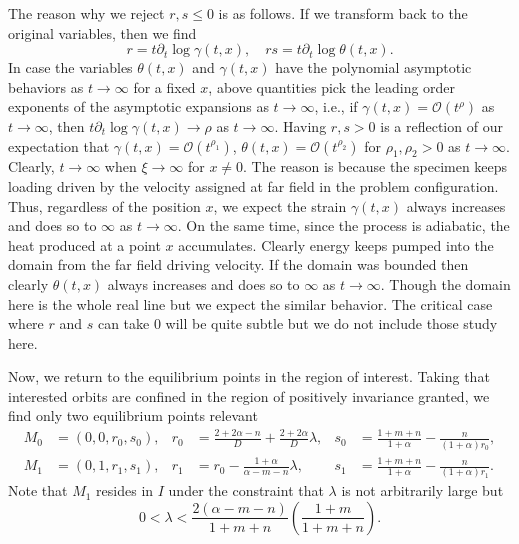 \documentclass[a4paper,11pt]{article}
\begin{document}
The reason why we reject $r,s\le0$ is as follows. If we transform back to the original variables, then we find
\begin{equation*}
 r=t\partial_t\log \gamma(t,x), \quad rs=t\partial_t \log \theta(t,x).
\end{equation*}
In case the variables $\theta(t,x)$ and $\gamma(t,x)$ have the polynomial asymptotic behaviors as $t \rightarrow \infty$ for a fixed $x$, above quantities pick the leading order exponents of the asymptotic expansions as $t \rightarrow \infty$, i.e., if $\gamma(t,x) = \mathcal{O}(t^\rho)$ as $t \rightarrow \infty$, then $t\partial_t\log \gamma(t,x) \rightarrow \rho$ as $t \rightarrow \infty$. Having $r,s>0$ is a reflection of our expectation that $\gamma(t,x) = \mathcal{O}(t^{\rho_1})$, $\theta(t,x) = \mathcal{O}(t^{\rho_2})$ for $\rho_1,\rho_2 >0$ as $t \rightarrow \infty$. Clearly, $t \rightarrow \infty$ when $\xi \rightarrow \infty$ for $x\ne0$. The reason is because the specimen keeps loading driven by the velocity assigned at far field in the problem configuration. Thus, regardless of the position $x$, we expect the strain $\gamma(t,x)$ always increases and does so to  $\infty$ as $t \rightarrow\infty$. On the same time, since the process is adiabatic, the heat produced at a point $x$ accumulates. Clearly energy keeps pumped into the domain from the far field driving velocity. If the domain was bounded then clearly $\theta(t,x)$ always increases and does so to  $\infty$ as $t \rightarrow\infty$. Though the domain here is the whole real line but we expect the similar behavior. The critical case where $r$ and $s$ can take $0$ will be quite subtle but we do not include those study here.

Now, we return to the equilibrium points in the region of interest.
Taking that interested orbits are confined in the region of positively invariance granted, we find only two equilibrium points relevant
\begin{align*}
 M_0 &= (0,0,r_0,s_0), & r_0 &=\frac{2+2\alpha-n}{D} + \frac{2+2\alpha}{D}\lambda, & s_0&=\frac{1+m+n}{1+\alpha} - \frac{n}{(1+\alpha)r_0},\\
 M_1 &= (0,1,r_1,s_1), & r_1 &= r_0-\frac{1+\alpha}{\alpha-m-n}\lambda, & s_1&=\frac{1+m+n}{1+\alpha} - \frac{n}{(1+\alpha)r_1}.
\end{align*}
Note that $M_1$ resides in $I$ under the constraint that $\lambda$ is not arbitrarily large but   
\begin{equation} \label{eq:lambda-range}
 0< \lambda < \frac{2(\alpha-m-n)}{1+m+n}\left(\frac{1+m}{1+m+n}\right).
\end{equation}
\end{document}
